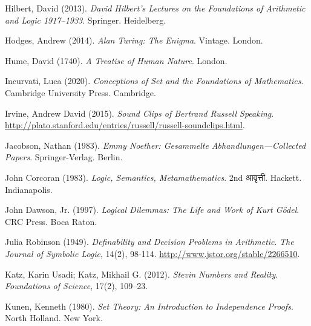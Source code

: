 \par\medskip{}\label{bib:EwaldSieg2013}
Hilbert, David (2013). \emph{{D}avid {H}ilbert's Lectures on the Foundations of Arithmetic and Logic 1917--1933}. Springer. Heidelberg.

\par\medskip{}\label{bib:Hodges2014}
Hodges, Andrew (2014). \emph{Alan Turing: The Enigma}. Vintage. London.

\par\medskip{}\label{bib:Hume1740}
Hume, David (1740). \emph{A Treatise of Human Nature}. London.

\par\medskip{}\label{bib:Incurvati2020}
Incurvati, Luca (2020). \emph{Conceptions of Set and the Foundations of Mathematics}. Cambridge University Press. Cambridge.

\par\medskip{}\label{bib:Irvine2015}
Irvine, Andrew David (2015). \emph{Sound Clips of {B}ertrand {R}ussell Speaking}. \url{http://plato.stanford.edu/entries/russell/russell-soundclips.html}.

\par\medskip{}\label{bib:Noether1983}
Jacobson, Nathan (1983). \emph{Emmy {N}oether: {G}esammelte {A}bhandlungen---{C}ollected {P}apers}. Springer-Verlag. Berlin.

\par\medskip{}\label{bib:Tarski1983}
John Corcoran (1983). \emph{Logic, Semantics, Metamathematics}. 2nd आवृत्ती. Hackett. Indianapolis.

\par\medskip{}\label{bib:Dawson1997}
John Dawson, Jr. (1997). \emph{Logical Dilemmas: The Life and Work of Kurt {G}\"odel}. CRC Press. Boca Raton.

\par\medskip{}\label{bib:Robinson1949}
Julia Robinson (1949). \emph{Definability and Decision Problems in Arithmetic}. \emph{The Journal of Symbolic Logic}, 14(2), 98-114. \url{http://www.jstor.org/stable/2266510}.

\par\medskip{}\label{bib:KatzKatz2012}
Katz, Karin Usadi; Katz, Mikhail G. (2012). \emph{{S}tevin Numbers and Reality}. \emph{Foundations of Science}, 17(2), 109--23.

\par\medskip{}\label{bib:Kunen1980}
Kunen, Kenneth (1980). \emph{Set Theory: An Introduction to Independence Proofs}. North Holland. New York.

